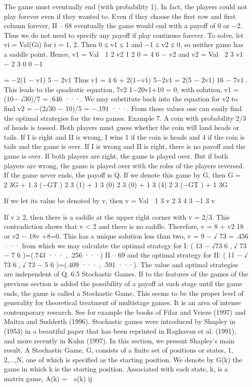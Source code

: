 The game must eventually end (with probability 1). In fact, the players could not play
forever even if they wanted to. Even if they choose the first row and first column forever,
II – 68
eventually the game would end with a payoff of 0 or −2. Thus we do not need to specify
any payoff if play continues forever. To solve, let vi = Val(Gi) for i = 1, 2. Then 0 ≤ v1 ≤ 1
and −1 ≤ v2 ≤ 0, so neither game has a saddle point. Hence,
v1 = Val  1
2 v2 1
2 0
= 4
6 − v2
and
v2 = Val  2
3 v1 − 2
3 0
0 −1

= −2(1 − v1)
5 − 2v1
Thus
v1 = 4
6 + 2(1−v1)
5−2v1
= 2(5 − 2v1)
16 − 7v1
.
This leads to the quadratic equation, 7v2
1−20v1+10 = 0, with solution, v1 = (10−
√30)/7 =
.646 ···. We may substitute back into the equation for v2 to find v2 = −(2√30 − 10)/5 =
−.191 ···. From these values one can easily find the optimal strategies for the two games.
Example 7. A coin with probability 2/3 of heads is tossed. Both players must guess
whether the coin will land heads or tails. If I is right and II is wrong, I wins 1 if the coin
is heads and 4 if the coin is tails and the game is over. If I is wrong and II is right, there
is no payoff and the game is over. If both players are right, the game is played over. But
if both players are wrong, the game is played over with the roles of the players reversed.
If the game never ends, the payoff is Q.
If we denote this game by G, then
G =
 2
3G + 1
3 (−GT ) 2
3 (1) + 1
3 (0)
2
3 (0) + 1
3 (4) 2
3 (−GT ) + 1
3G

If we let its value be denoted by v, then
v = Val  1
3 v 2
3 4
3 −1
3 v

If v ≥ 2, then there is a saddle at the upper right corner with v = 2/3. This contradiction
shows that v < 2 and there is no saddle. Therefore,
v = 8 + v2
18
or v2 − 18v +8=0.
This has a unique solution less than two,
v = 9 − √
73 = .456 ···
from which we may calculate the optimal strategy for I:
(
13 − √73
6 ,
√
73 − 7
6 )=(.743 ··· , .256 ···)
II – 69
and the optimal strategy for II:
(
11 − √
73
6 ,
√
73 − 5
6 )=(.409 ··· , .591 ···).
The value and optimal strategies are independent of Q.
6.5 Stochastic Games. If to the features of the games of the previous section is
added the possibility of a payoff at each stage until the game ends, the game is called
a Stochastic Game. This seems to be the proper level of generality for theoretical
treatment of multistage games. It is an area of intense contemporary research. See for
example the books of Filar and Vrieze (1997) and Maitra and Sudderth (1996). Stochastic
games were introduced by Shapley in (1953) in a beautiful paper that has been reprinted
in Raghavan et al. (1991), and more recently in Kuhn (1997). In this section, we present
Shapley’s main result.
A Stochastic Game, G, consists of a finite set of positions or states, {1, 2,...,N}, one
of which is specified as the starting position. We denote by G(k) the game in which k is the
starting position. Associated with each state, k, is a matrix game, A(k) = 
a(k)
ij 

